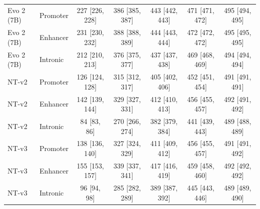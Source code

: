 \begin{table}[t]
\begin{tabular}{llc c c c c}
\midrule
Evo 2 (7B) & Promoter & 227 [226, 228] & 386 [385, 387] & 443 [442, 443] & 471 [471, 472] & 495 [494, 495] \\
Evo 2 (7B) & Enhancer & 231 [230, 232] & 388 [388, 389] & 444 [443, 444] & 472 [472, 472] & 495 [495, 495] \\
Evo 2 (7B) & Intronic & 212 [210, 213] & 376 [375, 377] & 437 [437, 438] & 469 [468, 469] & 494 [494, 494] \\
\midrule
NT-v2 & Promoter & 126 [124, 128] & 315 [312, 317] & 405 [402, 406] & 452 [451, 454] & 491 [491, 491] \\
NT-v2 & Enhancer & 142 [139, 144] & 329 [327, 331] & 412 [410, 413] & 456 [455, 457] & 492 [491, 492] \\
NT-v2 & Intronic & 84 [83, 86] & 270 [266, 274] & 382 [379, 384] & 441 [439, 443] & 489 [488, 489] \\
\midrule
NT-v3 & Promoter & 138 [136, 140] & 327 [324, 329] & 411 [409, 412] & 456 [455, 457] & 491 [491, 492] \\
NT-v3 & Enhancer & 155 [153, 157] & 339 [337, 341] & 417 [416, 419] & 459 [458, 460] & 492 [492, 492] \\
NT-v3 & Intronic & 96 [94, 98] & 285 [282, 289] & 389 [387, 392] & 445 [443, 446] & 489 [489, 490] \\
\bottomrule
\end{tabular}
\end{table}
